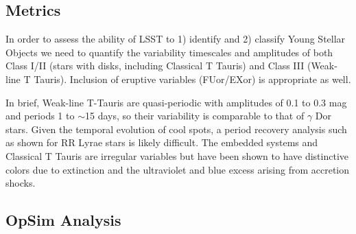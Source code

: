 






\subsection{Metrics}
\label{sec:\secname:metrics}

In order to assess the ability of LSST to 1) identify and 2) classify
Young Stellar Objects we need to quantify the variability timescales
and amplitudes of both Class I/II (stars with disks, including
Classical T Tauris) and Class III (Weak-line T Tauris).  Inclusion of
eruptive variables (FUor/EXor) is appropriate as well.

In brief, Weak-line T-Tauris are quasi-periodic with amplitudes of 0.1
to 0.3 mag and periods 1 to $\sim$15 days, so their variability is
comparable to that of $\gamma$ Dor stars. Given the temporal evolution
of cool spots, a period recovery analysis such as shown for RR Lyrae
stars is likely difficult.  The embedded systems and Classical T
Tauris are irregular variables but have been shown to have distinctive
colors due to extinction and the ultraviolet and blue excess arising
from accretion shocks.


\subsection{OpSim Analysis}
\label{sec:\secname:analysis}

